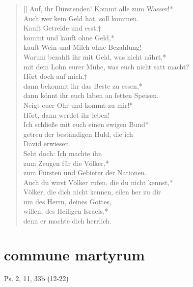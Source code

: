 \begin{verse}[\versewidth]
Auf, ihr Dürstenden! Kommt alle zum Wasser!*\\
Auch wer kein Geld hat, soll kommen.\\
\vin Kauft Getreide und esst,†\\
\vin kommt und kauft ohne Geld,*\\
\vin kauft Wein und Milch ohne Bezahlung!\\
Warum bezahlt ihr mit Geld, was nicht nährt,*\\
mit dem Lohn eurer Mühe, was euch nicht satt macht?\\
\vin Hört doch auf mich,†\\
\vin dann bekommt ihr das Beste zu essen,*\\
\vin dann könnt ihr euch laben an fetten Speisen.\\
Neigt euer Ohr und kommt zu mir!*\\
Hört, dann werdet ihr leben!\\
\vin Ich schließe mit euch einen ewigen Bund*\\
\vin getreu der beständigen Huld, die ich \\ \vin David erwiesen.\\
Seht doch: Ich machte ihn\\ zum Zeugen für die Völker,*\\
zum Fürsten und Gebieter der Nationen.\\
\vin Auch du wirst Völker rufen, die du nicht kennst,*\\
\vin Völker, die dich nicht kennen, eilen her zu dir\\
um des Herrn, deines Gottes,\\ willen, des Heiligen Israels,*\\
denn er machte dich herrlich.
\end{verse}

\hspace{2cm}

\section{commune martyrum}


Ps. 2, 11, 33b (12-22)\\

